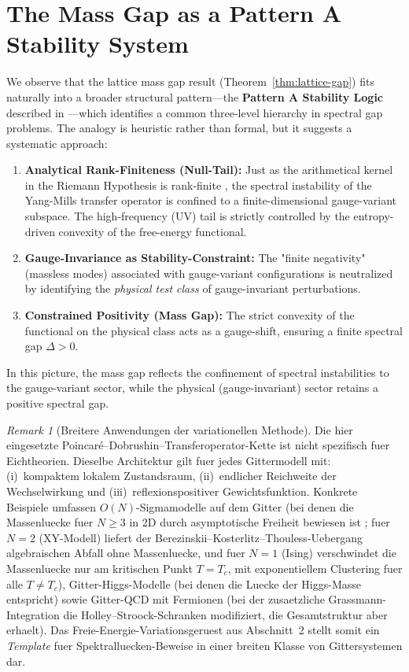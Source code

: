 \documentclass[12pt,a4paper]{article}
\theoremstyle{definition}
\theoremstyle{plain}
\theoremstyle{remark}
\newtheorem{remark}[definition]{Remark}
\begin{document}
\section{The Mass Gap as a Pattern A Stability System}

We observe that the lattice mass gap result (Theorem~\ref{thm:lattice-gap}) fits naturally into a broader structural pattern---the \textbf{Pattern A Stability Logic} described in \cite{FST-Unified2026}---which identifies a common three-level hierarchy in spectral gap problems. The analogy is heuristic rather than formal, but it suggests a systematic approach:

\begin{enumerate}[label=\alph*)]
    \item \textbf{Analytical Rank-Finiteness (Null-Tail):} Just as the arithmetical kernel in the Riemann Hypothesis is rank-finite \cite{GeigerRH2026c}, the spectral instability of the Yang-Mills transfer operator is confined to a finite-dimensional gauge-variant subspace. The high-frequency (UV) tail is strictly controlled by the entropy-driven convexity of the free-energy functional.
    \item \textbf{Gauge-Invariance as Stability-Constraint:} The "finite negativity" (massless modes) associated with gauge-variant configurations is neutralized by identifying the \emph{physical test class} of gauge-invariant perturbations.
    \item \textbf{Constrained Positivity (Mass Gap):} The strict convexity of the functional on the physical class acts as a gauge-shift, ensuring a finite spectral gap $\Delta > 0$. 
\end{enumerate}

In this picture, the mass gap reflects the confinement of spectral instabilities to the gauge-variant sector, while the physical (gauge-invariant) sector retains a positive spectral gap.

\begin{remark}[Breitere Anwendungen der variationellen Methode]
Die hier eingesetzte Poincar\'e--Dobrushin--Transferoperator-Kette ist nicht spezifisch fuer Eichtheorien. Dieselbe Architektur gilt fuer jedes Gittermodell mit: (i)~kompaktem lokalem Zustandsraum, (ii)~endlicher Reichweite der Wechselwirkung und (iii)~reflexionspositiver Gewichtsfunktion. Konkrete Beispiele umfassen $O(N)$-Sigmamodelle auf dem Gitter (bei denen die Massenluecke fuer $N \geq 3$ in 2D durch asymptotische Freiheit bewiesen ist \cite{Polyakov1975}; fuer $N = 2$ (XY-Modell) liefert der Berezinskii--Kosterlitz--Thouless-Uebergang algebraischen Abfall ohne Massenluecke, und fuer $N = 1$ (Ising) verschwindet die Massenluecke nur am kritischen Punkt $T = T_c$, mit exponentiellem Clustering fuer alle $T \neq T_c$), Gitter-Higgs-Modelle (bei denen die Luecke der Higgs-Masse entspricht) sowie Gitter-QCD mit Fermionen (bei der zusaetzliche Grassmann-Integration die Holley--Stroock-Schranken modifiziert, die Gesamtstruktur aber erhaelt). Das Freie-Energie-Variationsgeruest aus Abschnitt~2 stellt somit ein \emph{Template} fuer Spektralluecken-Beweise in einer breiten Klasse von Gittersystemen dar.
\end{remark}
\end{document}
